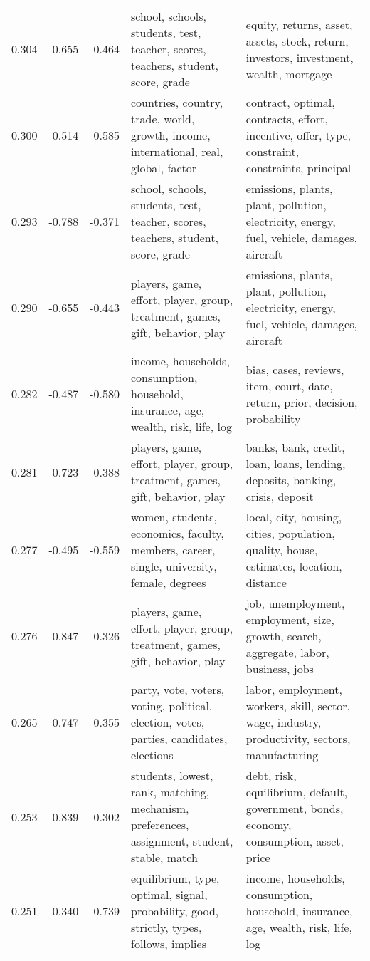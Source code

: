 \begin{tabular}{cccp{5cm}p{5cm}}
0.304 & -0.655 & -0.464 & school, schools, students, test, teacher, scores, teachers, student, score, grade & equity, returns, asset, assets, stock, return, investors, investment, wealth, mortgage \\
0.300 & -0.514 & -0.585 & countries, country, trade, world, growth, income, international, real, global, factor & contract, optimal, contracts, effort, incentive, offer, type, constraint, constraints, principal \\
0.293 & -0.788 & -0.371 & school, schools, students, test, teacher, scores, teachers, student, score, grade & emissions, plants, plant, pollution, electricity, energy, fuel, vehicle, damages, aircraft \\
0.290 & -0.655 & -0.443 & players, game, effort, player, group, treatment, games, gift, behavior, play & emissions, plants, plant, pollution, electricity, energy, fuel, vehicle, damages, aircraft \\
0.282 & -0.487 & -0.580 & income, households, consumption, household, insurance, age, wealth, risk, life, log & bias, cases, reviews, item, court, date, return, prior, decision, probability \\
0.281 & -0.723 & -0.388 & players, game, effort, player, group, treatment, games, gift, behavior, play & banks, bank, credit, loan, loans, lending, deposits, banking, crisis, deposit \\
0.277 & -0.495 & -0.559 & women, students, economics, faculty, members, career, single, university, female, degrees & local, city, housing, cities, population, quality, house, estimates, location, distance \\
0.276 & -0.847 & -0.326 & players, game, effort, player, group, treatment, games, gift, behavior, play & job, unemployment, employment, size, growth, search, aggregate, labor, business, jobs \\
0.265 & -0.747 & -0.355 & party, vote, voters, voting, political, election, votes, parties, candidates, elections & labor, employment, workers, skill, sector, wage, industry, productivity, sectors, manufacturing \\
0.253 & -0.839 & -0.302 & students, lowest, rank, matching, mechanism, preferences, assignment, student, stable, match & debt, risk, equilibrium, default, government, bonds, economy, consumption, asset, price \\
0.251 & -0.340 & -0.739 & equilibrium, type, optimal, signal, probability, good, strictly, types, follows, implies & income, households, consumption, household, insurance, age, wealth, risk, life, log \\

\end{tabular}

